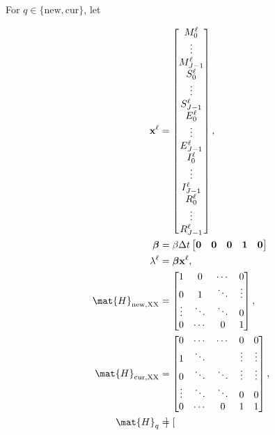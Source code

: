 \documentclass{jpmarticle}
\renewcommand{\vec}[1]{\boldsymbol{\mathrm{#1}}}
\let\subequationsorig\subequations%
\let\endsubequationsorig\endsubequations%
\renewenvironment{subequations}{
  \subequationsorig
  \renewcommand{\theequation}{\theparentequation.\arabic{equation}}
}{
  \endsubequationsorig
}
\begin{document}
For $q \in \{\mathrm{new}, \mathrm{cur}\}$, let
\begin{subequations}
  \begin{align}
    \vec{x}^{\ell} &=
    \begin{bmatrix}
      M_0^{\ell} \\ \vdots \\ M_{J - 1}^{\ell} \\
      S_0^{\ell} \\ \vdots \\ S_{J - 1}^{\ell} \\
      E_0^{\ell} \\ \vdots \\ E_{J - 1}^{\ell} \\
      I_0^{\ell} \\ \vdots \\ I_{J - 1}^{\ell} \\
      R_0^{\ell} \\ \vdots \\ R_{J - 1}^{\ell}
    \end{bmatrix},
    \\
    \vec{\beta} &=
    \beta \Delta t
    \begin{bmatrix}
      \vec{0} & \vec{0} & \vec{0} & \vec{1} & \vec{0}
    \end{bmatrix}
    \\
    \lambda^{\ell} &=
    \vec{\beta} \vec{x}^{\ell},
    \\
    \mat{H}_{\mathrm{new}, \mathrm{XX}} &=
    \begin{bmatrix}
      1 & 0 & \cdots & 0 \\
      0 & 1 & \ddots & \vdots \\
      \vdots & \ddots & \ddots & 0 \\
      0 & \cdots & 0 & 1
    \end{bmatrix},
    \\
    \mat{H}_{\mathrm{cur}, \mathrm{XX}} &=
    \begin{bmatrix}
      0 & \cdots & \cdots & 0 & 0 \\
      1 & \ddots & & \vdots & \vdots \\
      0 & \ddots & \ddots & \vdots & \vdots \\
      \vdots & \ddots & \ddots & 0 & 0 \\
      0 & \cdots & 0 & 1 & 1
    \end{bmatrix},
    \\
    \mat{H}_{q} &=
    \begin{bmatrix}

\end{bmatrix}
\end{align}
\end{subequations}
\end{document}
